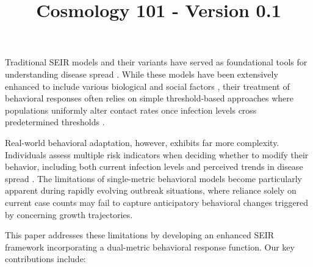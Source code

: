 \documentclass{article}\usepackage{graphicx} \usepackage{amsmath} \usepackage{colortbl}\title{Cosmology 101 - Version 0.1}
\begin{document}
Traditional SEIR models and their variants have served as foundational tools for understanding disease spread \cite{anderson1992infectious}. While these models have been extensively enhanced to include various biological and social factors \cite{hethcote2000mathematics}, their treatment of behavioral responses often relies on simple threshold-based approaches where populations uniformly alter contact rates once infection levels cross predetermined thresholds \cite{funk2010modelling}.

Real-world behavioral adaptation, however, exhibits far more complexity. Individuals assess multiple risk indicators when deciding whether to modify their behavior, including both current infection levels and perceived trends in disease spread \cite{wang2020impact}. The limitations of single-metric behavioral models become particularly apparent during rapidly evolving outbreak situations, where reliance solely on current case counts may fail to capture anticipatory behavioral changes triggered by concerning growth trajectories.

This paper addresses these limitations by developing an enhanced SEIR framework incorporating a dual-metric behavioral response function. Our key contributions include:
\end{document}
